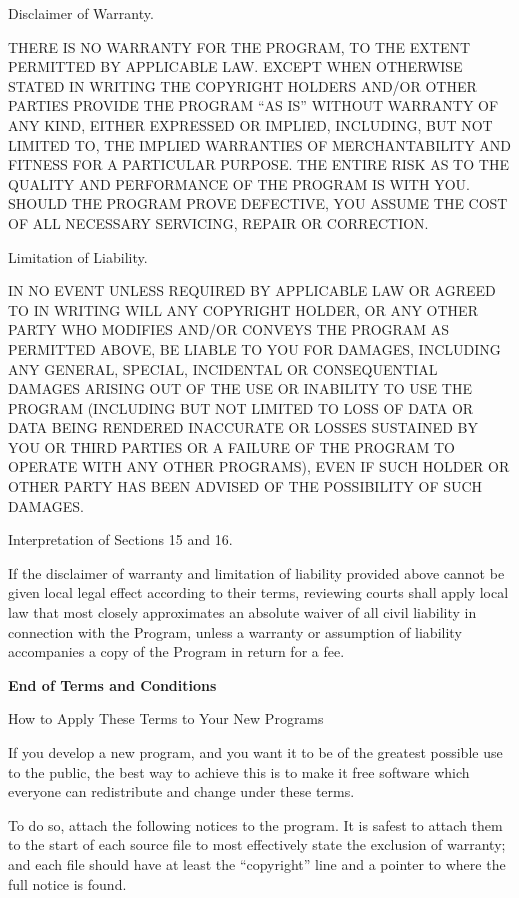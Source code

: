 \item Disclaimer of Warranty.

 THERE IS NO WARRANTY FOR THE PROGRAM, TO THE EXTENT PERMITTED BY
 APPLICABLE LAW.  EXCEPT WHEN OTHERWISE STATED IN WRITING THE
 COPYRIGHT HOLDERS AND/OR OTHER PARTIES PROVIDE THE PROGRAM ``AS IS''
 WITHOUT WARRANTY OF ANY KIND, EITHER EXPRESSED OR IMPLIED,
 INCLUDING, BUT NOT LIMITED TO, THE IMPLIED WARRANTIES OF
 MERCHANTABILITY AND FITNESS FOR A PARTICULAR PURPOSE.  THE ENTIRE
 RISK AS TO THE QUALITY AND PERFORMANCE OF THE PROGRAM IS WITH YOU.
 SHOULD THE PROGRAM PROVE DEFECTIVE, YOU ASSUME THE COST OF ALL
 NECESSARY SERVICING, REPAIR OR CORRECTION.

\item Limitation of Liability.

 IN NO EVENT UNLESS REQUIRED BY APPLICABLE LAW OR AGREED TO IN
 WRITING WILL ANY COPYRIGHT HOLDER, OR ANY OTHER PARTY WHO MODIFIES
 AND/OR CONVEYS THE PROGRAM AS PERMITTED ABOVE, BE LIABLE TO YOU FOR
 DAMAGES, INCLUDING ANY GENERAL, SPECIAL, INCIDENTAL OR CONSEQUENTIAL
 DAMAGES ARISING OUT OF THE USE OR INABILITY TO USE THE PROGRAM
 (INCLUDING BUT NOT LIMITED TO LOSS OF DATA OR DATA BEING RENDERED
 INACCURATE OR LOSSES SUSTAINED BY YOU OR THIRD PARTIES OR A FAILURE
 OF THE PROGRAM TO OPERATE WITH ANY OTHER PROGRAMS), EVEN IF SUCH
 HOLDER OR OTHER PARTY HAS BEEN ADVISED OF THE POSSIBILITY OF SUCH
 DAMAGES.

\item Interpretation of Sections 15 and 16.

If the disclaimer of warranty and limitation of liability provided
above cannot be given local legal effect according to their terms,
reviewing courts shall apply local law that most closely approximates
an absolute waiver of all civil liability in connection with the
Program, unless a warranty or assumption of liability accompanies a
copy of the Program in return for a fee.


{\bf End of Terms and Conditions}

How to Apply These Terms to Your New Programs

If you develop a new program, and you want it to be of the greatest
possible use to the public, the best way to achieve this is to make it
free software which everyone can redistribute and change under these terms.

To do so, attach the following notices to the program.  It is safest
to attach them to the start of each source file to most effectively
state the exclusion of warranty; and each file should have at least
the ``copyright'' line and a pointer to where the full notice is found.

